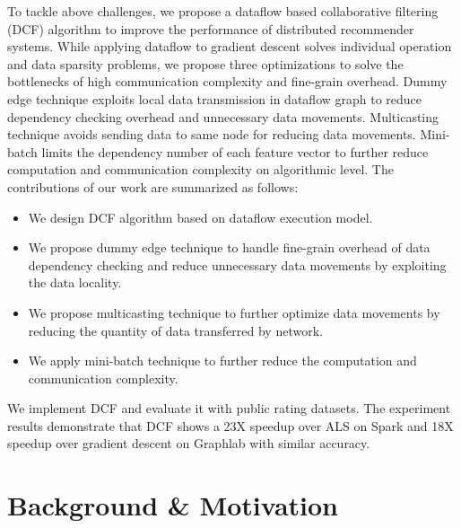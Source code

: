 \documentclass{llncs}
\begin{document}
To tackle above challenges, we propose a dataflow based collaborative filtering (DCF) algorithm to improve the performance of distributed recommender systems. While applying dataflow to gradient descent solves individual operation and data sparsity problems, we propose three optimizations to solve the bottlenecks of high communication complexity and fine-grain overhead. Dummy edge technique exploits local data transmission in dataflow graph to reduce dependency checking overhead and unnecessary data movements. Multicasting technique avoids sending data to same node for reducing data movements. Mini-batch limits the dependency number of each feature vector to further reduce computation and communication complexity on algorithmic level. The contributions of our work are summarized as follows:
\vspace{-5pt}
\begin{itemize}
\item
We design DCF algorithm based on dataflow execution model.
\item
We propose dummy edge technique to handle fine-grain overhead of data dependency checking and reduce unnecessary data movements by exploiting the data locality.
\item
We propose multicasting technique to further optimize data movements by reducing the quantity of data transferred by network.
\item 
We apply mini-batch technique to further reduce the computation and communication complexity.
\end{itemize}
\vspace{-5pt}

We implement DCF and evaluate it with public rating datasets. The experiment results demonstrate that DCF shows a 23X speedup over ALS on Spark and 18X speedup over gradient descent on Graphlab with similar accuracy.

\vspace{-10pt}

\section{Background \& Motivation}
\vspace{-10pt}
\end{document}
